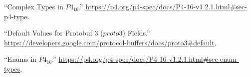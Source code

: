 \documentclass[11pt]{article}
\begin{document}
{{\begin{thebibliography}{40}
\mdbibitemlabel{{}[4]}\textquotedblleft{}Complex Types in $P4_{16}$.\textquotedblright{} \href{https://p4.org/p4-spec/docs/P4-16-v1.2.1.html\%23sec-p4-type}{{\ttfamily https://\hspace{0pt}p4.\hspace{0pt}org/\hspace{0pt}p4-\hspace{0pt}spec/\hspace{0pt}docs/\hspace{0pt}P4-\hspace{0pt}16-\hspace{0pt}v1.\hspace{0pt}2.\hspace{0pt}1.\hspace{0pt}html\#\hspace{0pt}sec-\hspace{0pt}p4-\hspace{0pt}type}}.\label{p4complextypes}%

\mdbibitemlabel{{}[5]}\textquotedblleft{}Default Values for Protobuf 3 ($proto3$) Fields.\textquotedblright{} \href{https://developers.google.com/protocol-buffers/docs/proto3\%23default}{{\ttfamily https://\hspace{0pt}developers.\hspace{0pt}google.\hspace{0pt}com/\hspace{0pt}protocol-\hspace{0pt}buffers/\hspace{0pt}docs/\hspace{0pt}proto3\#\hspace{0pt}default}}.\label{protodefaults}%

\mdbibitemlabel{{}[6]}\textquotedblleft{}Enums in $P4_{16}$.\textquotedblright{} \href{https://p4.org/p4-spec/docs/P4-16-v1.2.1.html\%23sec-enum-types}{{\ttfamily https://\hspace{0pt}p4.\hspace{0pt}org/\hspace{0pt}p4-\hspace{0pt}spec/\hspace{0pt}docs/\hspace{0pt}P4-\hspace{0pt}16-\hspace{0pt}v1.\hspace{0pt}2.\hspace{0pt}1.\hspace{0pt}html\#\hspace{0pt}sec-\hspace{0pt}enum-\hspace{0pt}types}}.\label{p4enums}%


\end{thebibliography}}}
\end{document}
